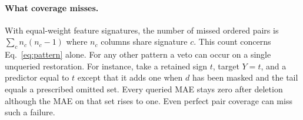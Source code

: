 \paragraph{What coverage misses.}
With equal-weight feature signatures, the number of missed ordered pairs is $\sum_c n_c(n_c-1)$ where $n_c$ columns share signature $c$. This count concerns Eq.~\eqref{eq:pattern} alone. For any other pattern a veto can occur on a single unqueried restoration. For instance, take a retained sign $t$, target $Y=t$, and a predictor equal to $t$ except that it adds one when $d$ has been masked and the tail equals a prescribed omitted set. Every queried MAE stays zero after deletion although the MAE on that set rises to one. Even perfect pair coverage can miss such a failure.
